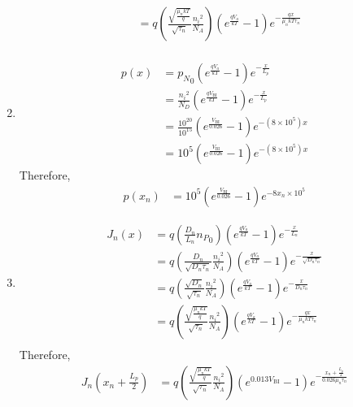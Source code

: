 \documentclass[fleqn, a4paper, 10pt, oneside]{amsart}
\theoremstyle{definition}
\theoremstyle{theorem}
\begin{document}
\begin{solution}
\begin{enumerate}[leftmargin=*]
\begin{align*}
				&= q \left( \frac{\sqrt{\frac{\mu_n k T}{q}}}{\sqrt{\tau_n}} \frac{{n_i}^2}{N_A} \right) \left( e^{\frac{q V_a}{k T}} - 1 \right) e^{-\frac{q x}{\mu_n k T \tau_n}}\\
			\end{align*}
		\item
			\begin{align*}
				p(x) &= {p_N}_0 \left( e^{\frac{q V_a}{k T}} - 1 \right) e^{-\frac{x}{L_p}}\\
				&= \frac{{n_i}^2}{N_D} \left( e^{\frac{q V_{\text{BI}}}{k T}} - 1 \right) e^{-\frac{x}{L_p}}\\
				&= \frac{10^{20}}{10^{15}} \left( e^{\frac{V_{\text{BI}}}{0.026}} - 1 \right) e^{-\left( 8 \times 10^5 \right) x}\\
				&= 10^5 \left( e^{\frac{V_{\text{BI}}}{0.026}} - 1 \right) e^{-\left( 8 \times 10^5 \right) x}
			\end{align*}
			Therefore,
			\begin{align*}
				p(x_n) &= 10^5 \left( e^{\frac{V_{\text{BI}}}{0.026}} - 1 \right) e^{-8 x_n \times 10^5}
			\end{align*}
		\item
			\begin{align*}
				J_n(x) &= q \left( \frac{D_n}{L_n} {n_P}_0 \right) \left( e^{\frac{q V_a}{k T}} - 1 \right) e^{-\frac{x}{L_n}}\\
				&= q \left( \frac{D_n}{\sqrt{D_n \tau_n}} \frac{{n_i}^2}{N_A} \right) \left( e^{\frac{q V_a}{k T}} - 1 \right) e^{-\frac{x}{\sqrt{D_n \tau_n}}}\\
				&= q \left( \frac{\sqrt{D_n}}{\sqrt{\tau_n}} \frac{{n_i}^2}{N_A} \right) \left( e^{\frac{q V_a}{k T}} - 1 \right) e^{-\frac{x}{D_n \tau_n}}\\
				&= q \left( \frac{\sqrt{\frac{\mu_n k T}{q}}}{\sqrt{\tau_n}} \frac{{n_i}^2}{N_A} \right) \left( e^{\frac{q V_a}{k T}} - 1 \right) e^{-\frac{q x}{\mu_n k T \tau_n}}\\
			\end{align*}
			Therefore,
			\begin{align*}
				J_n\left( x_n + \frac{L_p}{2} \right) &= q \left( \frac{\sqrt{\frac{\mu_n k T}{q}}}{\sqrt{\tau_n}} \frac{{n_i}^2}{N_A} \right) \left( e^{0.013 V_{\text{BI}}} - 1 \right) e^{-\frac{x_n + \frac{L_p}{2}}{0.026 \mu_n \tau_n}}\\
			\end{align*}
	\end{enumerate}
\end{solution}
\end{document}
